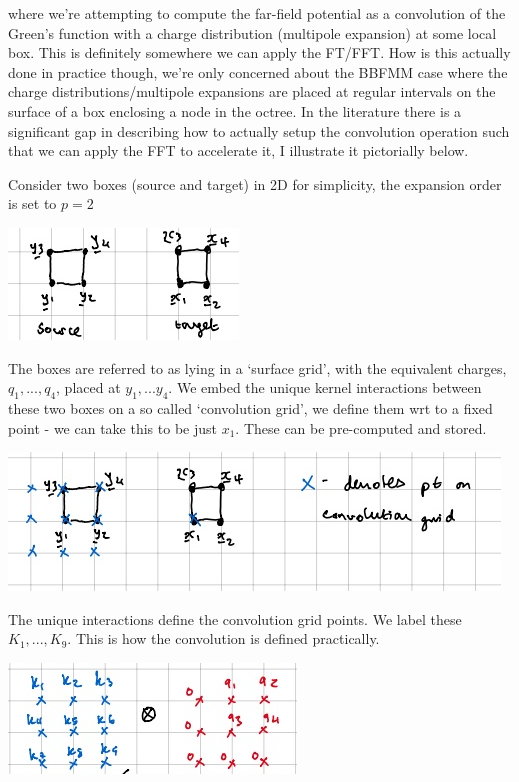 \documentclass[12pt, a4, twoside]{article}
\begin{document}
where we're attempting to compute the far-field potential as a convolution of the Green's function with a charge distribution (multipole expansion) at some local box. This is definitely somewhere we can apply the FT/FFT. How is this actually done in practice though, we're only concerned about the BBFMM \cite{Fong2009} case where the charge distributions/multipole expansions are placed at regular intervals on the surface of a box enclosing a node in the octree. In the literature there is a significant gap in describing how to actually setup the convolution operation such that we can apply the FFT to accelerate it, I illustrate it pictorially below.

Consider two boxes (source and target) in 2D for simplicity, the expansion order is set to $p=2$

\begin{center}    
\includegraphics{setup.jpg}
\end{center}

The boxes are referred to as lying in a `surface grid', with the equivalent charges, $q_1,...,q_4$,  placed at $y_1,...y_4$. We embed the unique kernel interactions between these two boxes on a so called `convolution grid', we define them wrt to a fixed point - we can take this to be just $x_1$. These can be pre-computed and stored.

\begin{center}    
    \includegraphics{conv_grid.jpg}
\end{center}

The unique interactions define the convolution grid points. We label these $K_1,...,K_9$. This is how the convolution is defined practically.

\begin{center}    
    \includegraphics{conv.jpg}
\end{center}
\end{document}
